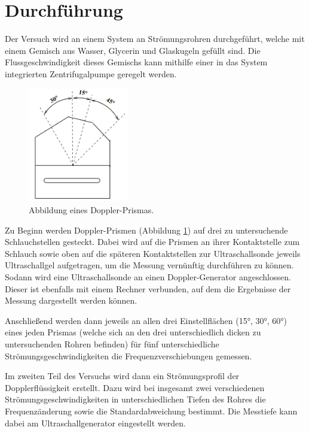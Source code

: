 \section{Durchführung}
\label{sec:Durchführung}

Der Versuch wird an einem System an Strömungsrohren durchgeführt, welche mit einem
Gemisch aus Wasser, Glycerin und Glaskugeln gefüllt sind. Die Flussgeschwindigkeit
dieses Gemischs kann mithilfe einer in das System integrierten Zentrifugalpumpe geregelt werden.

\begin{figure}[H]
  \centering
  \includegraphics[height=5cm]{Prisma.PNG}
  \caption{Abbildung eines Doppler-Prismas. \cite{sample}}
  \label{fig:prisma}
\end{figure}

Zu Beginn werden Doppler-Prismen (Abbildung \ref{fig:prisma}) auf drei zu untersuchende Schlauchstellen gesteckt.
Dabei wird auf die Prismen an ihrer Kontaktstelle zum Schlauch sowie oben auf die
späteren Kontaktstellen zur Ultraschallsonde jeweils Ultraschallgel aufgetragen, um
die Messung vernünftig durchführen zu können. Sodann wird eine Ultraschallsonde an einen
Doppler-Generator angeschlossen. Dieser ist ebenfalls mit einem Rechner verbunden,
auf dem die Ergebnisse der Messung dargestellt werden können.

Anschließend werden dann jeweils an allen drei Einstellflächen  (15°, 30°, 60°) eines jeden Prismas
(welche sich an den drei unterschiedlich dicken zu untersuchenden Rohren befinden)
für fünf unterschiedliche Strömungsgeschwindigkeiten die Frequenzverschiebungen gemessen.

Im zweiten Teil des Versuchs wird dann ein Strömungsprofil der Dopplerflüssigkeit erstellt.
Dazu wird bei insgesamt zwei verschiedenen Strömungsgeschwindigkeiten in unterschiedlichen
Tiefen des Rohres die Frequenzänderung sowie die Standardabweichung bestimmt.
Die Messtiefe kann dabei am Ultraschallgenerator eingestellt werden.
